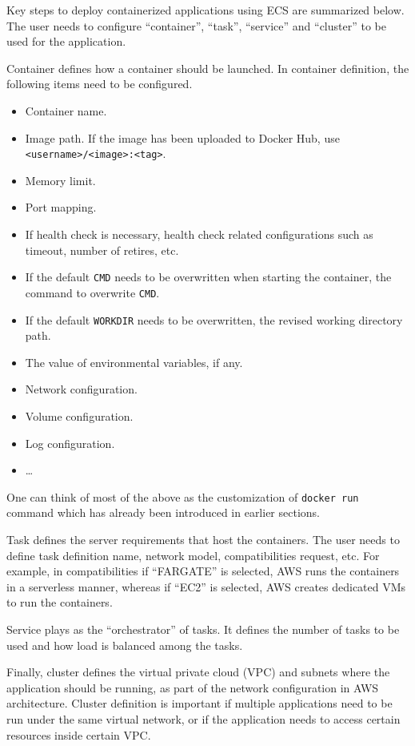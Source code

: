 Key steps to deploy containerized applications using ECS are summarized below. The user needs to configure ``container'', ``task'', ``service'' and ``cluster'' to be used for the application.

Container defines how a container should be launched. In container definition, the following items need to be configured.
\begin{itemize}
  \item Container name.
  \item Image path. If the image has been uploaded to Docker Hub, use \texttt{<username>/<image>:<tag>}.
  \item Memory limit.
  \item Port mapping.
  \item If health check is necessary, health check related configurations such as timeout, number of retires, etc.
  \item If the default \verb|CMD| needs to be overwritten when starting the container, the command to overwrite \verb|CMD|.
  \item If the default \verb|WORKDIR| needs to be overwritten, the revised working directory path.
  \item The value of environmental variables, if any.
  \item Network configuration.
  \item Volume configuration.
  \item Log configuration.
  \item \ldots
\end{itemize}
One can think of most of the above as the customization of \verb|docker run| command which has already been introduced in earlier sections.

Task defines the server requirements that host the containers. The user needs to define task definition name, network model, compatibilities request, etc. For example, in compatibilities if ``FARGATE'' is selected, AWS runs the containers in a serverless manner, whereas if ``EC2'' is selected, AWS creates dedicated VMs to run the containers.

Service plays as the ``orchestrator'' of tasks. It defines the number of tasks to be used and how load is balanced among the tasks.

Finally, cluster defines the virtual private cloud (VPC) and subnets where the application should be running, as part of the network configuration in AWS architecture. Cluster definition is important if multiple applications need to be run under the same virtual network, or if the application needs to access certain resources inside certain VPC.

